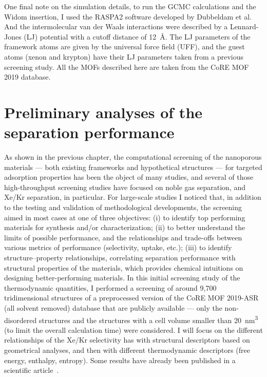 \documentclass[main.tex]{subfiles}
\begin{document}
One final note on the simulation details, to run the GCMC calculations and the Widom insertion, I used the RASPA2 software developed by Dubbeldam et al.\autocite{dubbeldam2016} And the intermolecular van der Waals interactions were described by a Lennard-Jones (LJ) potential with a cutoff distance of \SI{12}{\angstrom}. The LJ parameters of the framework atoms are given by the universal force field (UFF),\autocite{rappe1992} and the guest atoms (xenon and krypton) have their LJ parameters taken from a previous screening study.\autocite{Ryan_2010} All the MOFs described here are taken from the CoRE MOF 2019 database.\autocite{Chung_2019}


\section{Preliminary analyses of the separation performance}

As shown in the previous chapter, the computational screening of the nanoporous materials --- both existing frameworks and hypothetical structures --- for targeted adsorption properties has been the object of many studies, and several of those high-throughput screening studies have focused on noble gas separation, and Xe/Kr separation, in particular. For large-scale studies I noticed that, in addition to the testing and validation of methodological developments, the screening aimed in most cases at one of three objectives: (i) to identify top performing materials for synthesis and/or characterization; (ii) to better understand the limits of possible performance, and the relationships and trade-offs between various metrics of performance (selectivity, uptake, etc.); (iii) to identify structure--property relationships, correlating separation performance with structural properties of the materials, which provides chemical intuitions on designing better-performing materials. In this initial screening study of the thermodynamic quantities, I performed a screening of around 9,700 tridimensional structures of a preprocessed version of the CoRE MOF 2019-ASR (all solvent removed) database that are publicly available --- only the non-disordered structures and the structures with a cell volume smaller than \SI{20}{\nano\meter\cubed} (to limit the overall calculation time) were considered. I will focus on the different relationships of the Xe/Kr selectivity has with structural descriptors based on geometrical analyses, and then with different thermodynamic descriptors (free energy, enthalpy, entropy). Some results have already been published in a scientific article~\cite{Ren_2021}.
\end{document}
